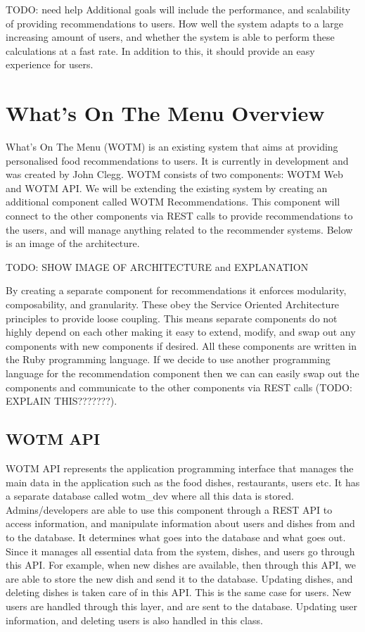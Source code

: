 TODO: need help
Additional goals will include the performance, and scalability of providing recommendations to users. How well the system adapts to a large increasing amount of users, and whether the system is able to perform these calculations at a fast rate. In addition to this, it should provide an easy experience for users.

\section{What's On The Menu Overview}

What's On The Menu (WOTM) is an existing system that aims at providing personalised food recommendations to users. It is currently in development and was created by John Clegg. WOTM consists of two components: WOTM Web and WOTM API. We will be extending the existing system by creating an additional component called WOTM Recommendations. This component will connect to the other components via REST calls to provide recommendations to the users, and will manage anything related to the recommender systems. Below is an image of the architecture. 

TODO: SHOW IMAGE OF ARCHITECTURE and EXPLANATION

By creating a separate component for recommendations it enforces modularity, composability, and granularity. These obey the Service Oriented Architecture principles to provide loose coupling. This means separate components do not highly depend on each other making it easy to extend, modify, and swap out any components with new components if desired. All these components are written in the Ruby programming language. If we decide to use another programming language for the recommendation component then we can can easily swap out the components and communicate to the other components via REST calls (TODO: EXPLAIN THIS???????). 


\subsection{WOTM API}

WOTM API represents the application programming interface that manages the main data in the application such as the food dishes, restaurants, users etc. It has a separate database called wotm\_dev where all this data is stored. Admins/developers are able to use this component through a REST API to access information, and manipulate information about users and dishes from and to the database. It determines what goes into the database and what goes out. Since it manages all essential data from the system, dishes, and users go through this API. For example, when new dishes are available, then through this API, we are able to store the new dish and send it to the database. Updating dishes, and deleting dishes is taken care of in this API. This is the same case for users. New users are handled through this layer, and are sent to the database. Updating user information, and deleting users is also handled in this class.

